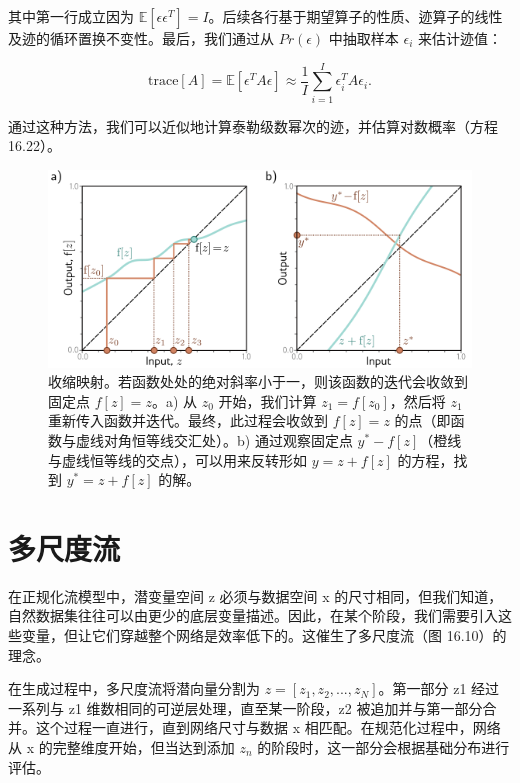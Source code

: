 其中第一行成立因为 \(\mathbb{E}[\epsilon \epsilon^T] = I\)。后续各行基于期望算子的性质、迹算子的线性及迹的循环置换不变性。最后，我们通过从 \(Pr(\epsilon)\) 中抽取样本 \(\epsilon_i\) 来估计迹值：

\begin{equation}
\text{trace}[A] = \mathbb{E} [\epsilon^T A \epsilon] \approx \frac{1}{I} \sum_{i=1}^I \epsilon_i^T A \epsilon_i. 
\end{equation}

通过这种方法，我们可以近似地计算泰勒级数幂次的迹，并估算对数概率（方程 16.22）。

\begin{figure}[ht!]
\centering
\includegraphics[width=0.7\linewidth]{png/chapter16/FlowBanach.png}
\caption{收缩映射。若函数处处的绝对斜率小于一，则该函数的迭代会收敛到固定点 \( f[z] = z \)。a) 从 \( z_0 \) 开始，我们计算 \( z_1 = f[z_0] \)，然后将 \( z_1 \) 重新传入函数并迭代。最终，此过程会收敛到 \( f[z] = z \) 的点（即函数与虚线对角恒等线交汇处）。b) 通过观察固定点 \( y^* - f[z] \)（橙线与虚线恒等线的交点），可以用来反转形如 \( y = z + f[z] \) 的方程，找到 \( y^* = z + f[z] \) 的解。}
\end{figure}


\section{多尺度流}
在正规化流模型中，潜变量空间 z 必须与数据空间 x 的尺寸相同，但我们知道，自然数据集往往可以由更少的底层变量描述。因此，在某个阶段，我们需要引入这些变量，但让它们穿越整个网络是效率低下的。这催生了多尺度流（图 16.10）的理念。

在生成过程中，多尺度流将潜向量分割为 \(z = [z_1,z_2,...,z_N]\)。第一部分 z1 经过一系列与 z1 维数相同的可逆层处理，直至某一阶段，z2 被追加并与第一部分合并。这个过程一直进行，直到网络尺寸与数据 x 相匹配。在规范化过程中，网络从 x 的完整维度开始，但当达到添加 \(z_n\) 的阶段时，这一部分会根据基础分布进行评估。

